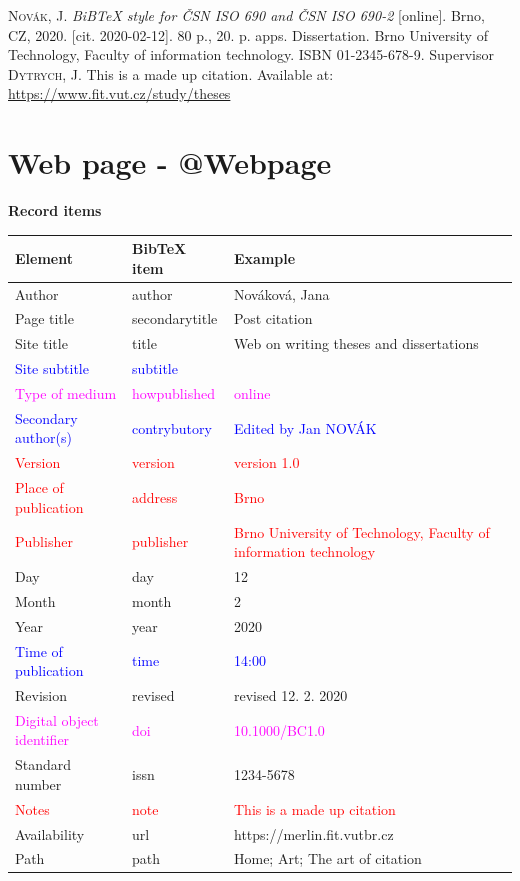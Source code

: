 \medskip

\noindent \textsc{Novák}, J. \textit{BiBTeX style for ČSN ISO 690 and ČSN ISO 690-2} [online]. Brno, CZ, 2020. [cit. 2020-02-12]. 80 p., 20. p. apps. Dissertation. Brno University of Technology, Faculty of information technology. ISBN 01-2345-678-9. Supervisor \textsc{Dytrych}, J. This is a made up citation. Available at: \url{https://www.fit.vut.cz/study/theses}
\newpage
\section*{Web page - @Webpage}
\label{pr-webpage}
\noindent \textbf{Record items}

\medskip

\begin{tabularx}{\linewidth}{X X X}
    Element & BibTeX item & Example\\\hline
    Author & author & Nováková, Jana\\
    Page title & secondarytitle & Post citation\\
    Site title & title & Web on writing theses and dissertations\\
    \textcolor{blue}{Site subtitle}  &  \textcolor{blue}{subtitle} & \\
    \textcolor{magenta}{Type of medium} & \textcolor{magenta}{howpublished} & \textcolor{magenta}{online}\\
    \textcolor{blue}{Secondary author(s)} & \textcolor{blue}{contrybutory} & \textcolor{blue}{Edited by Jan NOVÁK}\\
    \textcolor{red}{Version} & \textcolor{red}{version} & \textcolor{red}{version 1.0}\\
    \textcolor{red}{Place of publication} & \textcolor{red}{address} & \textcolor{red}{Brno}\\
    \textcolor{red}{Publisher} & \textcolor{red}{publisher} & \textcolor{red}{Brno University of Technology, Faculty of information technology}\\
    Day & day & 12\\
    Month & month & 2\\
    Year & year & 2020\\
    \textcolor{blue}{Time of publication} & \textcolor{blue}{time} & \textcolor{blue}{14:00}\\
    Revision & revised & revised 12. 2. 2020\\
    \textcolor{magenta}{Digital object identifier} & \textcolor{magenta}{doi} & \textcolor{magenta}{10.1000/BC1.0}\\
    Standard number & issn & 1234-5678\\
    \textcolor{red}{Notes} & \textcolor{red}{note} & \textcolor{red}{This is a made up citation}\\
    Availability & url & https://merlin.fit.vutbr.cz\\
    Path & path & Home; Art; The art of citation
\end{tabularx}

